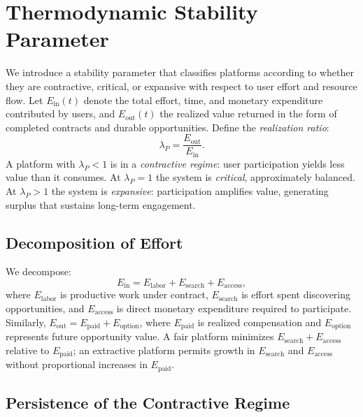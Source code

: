 \documentclass[11pt]{article}
\begin{document}
\section{Thermodynamic Stability Parameter}
\label{sec:lambda}

We introduce a stability parameter that classifies platforms according to
whether they are contractive, critical, or expansive with respect to user
effort and resource flow. Let $E_{\mathrm{in}}(t)$ denote the total effort,
time, and monetary expenditure contributed by users, and $E_{\mathrm{out}}(t)$
the realized value returned in the form of completed contracts and durable
opportunities. Define the \emph{realization ratio}:
\[
\lambda_P = \frac{E_{\mathrm{out}}}{E_{\mathrm{in}}}.
\]
A platform with $\lambda_P < 1$ is in a \emph{contractive regime}: user
participation yields less value than it consumes. At $\lambda_P = 1$ the
system is \emph{critical}, approximately balanced. At $\lambda_P > 1$ the
system is \emph{expansive}: participation amplifies value, generating surplus
that sustains long-term engagement.

\subsection{Decomposition of Effort}

We decompose:
\[
E_{\mathrm{in}} = E_{\mathrm{labor}} + E_{\mathrm{search}} +
E_{\mathrm{access}},
\]
where $E_{\mathrm{labor}}$ is productive work under contract,
$E_{\mathrm{search}}$ is effort spent discovering opportunities, and
$E_{\mathrm{access}}$ is direct monetary expenditure required to participate.
Similarly, $E_{\mathrm{out}} = E_{\mathrm{paid}} + E_{\mathrm{option}}$,
where $E_{\mathrm{paid}}$ is realized compensation and $E_{\mathrm{option}}$
represents future opportunity value. A fair platform minimizes
$E_{\mathrm{search}} + E_{\mathrm{access}}$ relative to $E_{\mathrm{paid}}$;
an extractive platform permits growth in $E_{\mathrm{search}}$ and
$E_{\mathrm{access}}$ without proportional increases in $E_{\mathrm{paid}}$.

\subsection{Persistence of the Contractive Regime}
\end{document}

